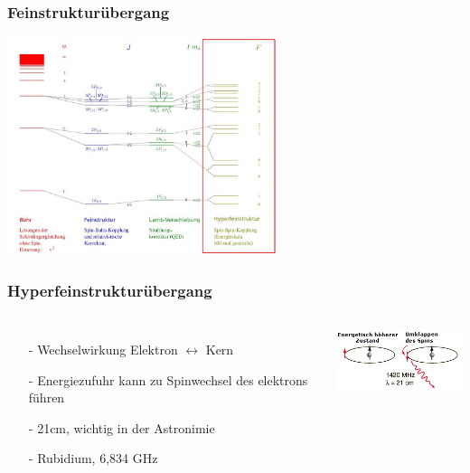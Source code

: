 \begin{frame}
	\frametitle {Feinstrukturübergang}
	
	\begin{center}
		\includegraphics[width = 8cm]{./pictures/energieniveaus3}
	\end{center}
	
\end{frame}

\begin{frame}
	\frametitle{Hyperfeinstrukturübergang}
	\begin{columns}
		\begin{itemize}
			\item[-] Wechselwirkung Elektron $\leftrightarrow$ Kern
			\item[-] Energiezufuhr kann zu Spinwechsel des elektrons führen
			\item[ ]
			\item[-] 21cm, wichtig in der Astronimie
			\item[]
			\item[-] Rubidium, 6,834 GHz
		\end{itemize}
		\includegraphics[width = 4cm]{./pictures/h21b}
	\end{columns}
	
\end{frame}


